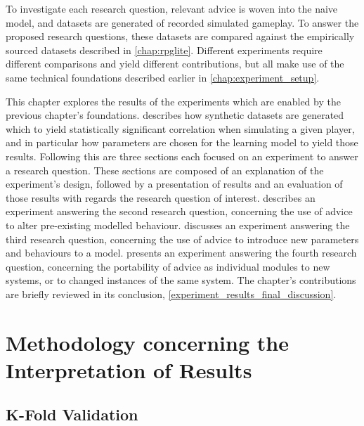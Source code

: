To investigate each research question, relevant advice is woven into the naive
model, and datasets are generated of recorded simulated gameplay. To answer the
proposed research questions, these datasets are compared against the empirically
sourced datasets described in \cref{chap:rpglite}. Different experiments require
different comparisons and yield different contributions, but all make use of the
same technical foundations described earlier in \cref{chap:experiment_setup}.

This chapter explores the results of the experiments which are enabled by the
previous chapter's foundations.  describes how
synthetic datasets are generated which to yield statistically significant
correlation when simulating a given player, and in particular how parameters are
chosen for the learning model to yield those results. Following this are three
sections each focused on an experiment to answer a research question. These
sections are composed of an explanation of the experiment's design, followed by
a presentation of results and an evaluation of those results with regards the
research question of interest.  describes an experiment answering
the second research question, concerning the use of advice to alter pre-existing
modelled behaviour.  discusses an experiment answering the third
research question, concerning the use of advice to introduce new parameters and
behaviours to a model.  presents an experiment answering the
fourth research question, concerning the portability of advice as individual
modules to new systems, or to changed instances of the same system. The
chapter's contributions are briefly reviewed in its conclusion,
\cref{experiment_results_final_discussion}.


\section{Methodology concerning the Interpretation of Results}
\label{methodology_explained}

\subsection{K-Fold Validation}
\label{k_fold_validation_explanation}


